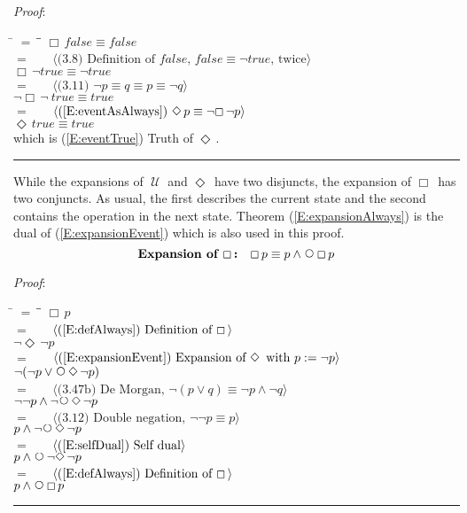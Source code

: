 \documentclass[12pt, fleqn, leqno]{article}
\newcommand{\lgap}{2pt}                             %
\newcommand{\mymathindent}{24pt}                    %
\newcommand{\Until}{\;\mathcal{U}\;}
\newcommand{\Next}{\;\,\text{\raisebox{3.5pt}{\circle{6}}}}
\newcommand{\Event}{\Diamond\,}
\newcommand{\Always}{\Box\,}
\newcommand{\myqed}{\rule[-.23ex]{1.2ex}{2.0ex}}
\newcommand{\myqedtab}{\hspace{384pt}}              %
\newcommand{\Gll} {\langle}                         %
\newcommand{\Ggg} {\rangle}                         %
\newcommand{\Hint}[1]     {\ \ \ $\Gll              \mbox{#1} \Ggg$ }   %
\begin{document}
\emph{Proof}:
\begin{tabbing}
\hspace{\mymathindent} \= $= \;$ \= \myqedtab \= \kill
  \> \>   $\Always false \equiv false$\\[\lgap]
  \> $=$  \>  \Hint{(3.8) Definition of $false$, $false\equiv \neg true$, twice}\\[\lgap]
  \> \>   $\Always\neg true \equiv \neg true$\\[\lgap]
  \> $=$  \>  \Hint{(3.11) $\neg p \equiv q \equiv p \equiv \neg q$}\\[\lgap]
  \> \>   $\neg\Always\neg\ true \equiv true$\\[\lgap]
  \> $=$  \>  \Hint{(\ref{E:eventAsAlways}) $\Event p \equiv \neg\Always\neg p$}\\[\lgap]
  \> \>   $\Event true \equiv true$\\[\lgap]
  \> which is (\ref{E:eventTrue}) Truth of $\Event$. \quad \myqed
\end{tabbing}

While the expansions of $\Until$ and $\Event$ have two disjuncts,
the expansion of $\Always$ has two conjuncts.
As usual, the first describes the current state and the second contains the operation in the next state.
Theorem (\ref{E:expansionAlways}) is the dual of (\ref{E:expansionEvent}) which is also used in this proof.
\begin{equation}\label{E:expansionAlways}
\textbf{Expansion of $\Always$:}\quad \Always p \equiv p \land \Next\Always p
\end{equation}

\emph{Proof}:
\begin{tabbing}
\hspace{\mymathindent} \= $= \;$ \= \myqedtab \= \kill
  \> \>   $\Always p$\\[\lgap]
  \> $=$  \>  \Hint{(\ref{E:defAlways}) Definition of $\Always$}\\[\lgap]
  \> \>   $\neg\Event\neg p$\\[\lgap]
  \> $=$  \>  \Hint{(\ref{E:expansionEvent}) Expansion of $\Event$ with $p := \neg p$}\\[\lgap]
  \> \>   $\neg(\neg p\lor\Next\Event\neg p)$\\[\lgap]
  \> $=$  \>  \Hint{(3.47b) De Morgan, $\neg (p \lor q) \equiv \neg p \land \neg q$}\\[\lgap]
  \> \>   $\neg\neg p\land\neg\Next\Event\neg p$\\[\lgap]
  \> $=$  \>  \Hint{(3.12) Double negation, $\neg\neg p \equiv p$}\\[\lgap]
  \> \>   $p\land\neg\Next\Event\neg p$\\[\lgap]
  \> $=$  \>  \Hint{(\ref{E:selfDual}) Self dual}\\[\lgap]
  \> \>   $p\land\Next\neg\Event\neg p$\\[\lgap]
  \> $=$  \>  \Hint{(\ref{E:defAlways}) Definition of $\Always$}\\[\lgap]
  \> \>   $p \land \Next\Always p$ \quad \myqed
\end{tabbing}
\end{document}
